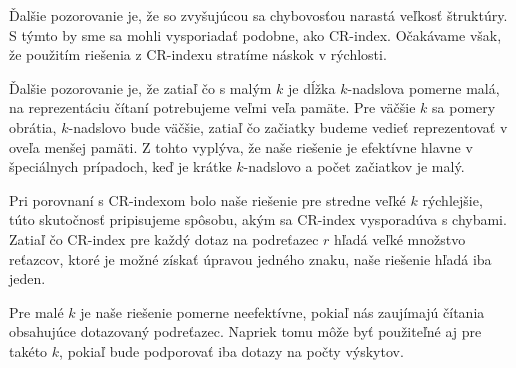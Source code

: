 Ďalšie pozorovanie je, že so zvyšujúcou sa chybovosťou narastá veľkosť štruktúry.
S týmto by sme sa mohli vysporiadať podobne, ako CR-index. Očakávame však, že použitím
riešenia z CR-indexu stratíme náskok v rýchlosti.

Ďalšie pozorovanie je, že zatiaľ čo s malým $k$ je dĺžka $k$-nadslova pomerne malá, na
reprezentáciu čítaní potrebujeme veľmi veľa pamäte. Pre väčšie $k$ sa pomery obrátia,
$k$-nadslovo bude väčšie, zatiaľ čo začiatky budeme vedieť reprezentovať v oveľa menšej pamäti.
Z tohto vyplýva, že naše riešenie je efektívne hlavne v špeciálnych prípadoch, keď
je krátke $k$-nadslovo a počet začiatkov je malý.

Pri porovnaní s CR-indexom bolo naše riešenie pre stredne veľké $k$ rýchlejšie, túto
skutočnosť pripisujeme spôsobu, akým sa CR-index vysporadúva s chybami. Zatiaľ čo
CR-index pre každý dotaz na podreťazec $r$ hľadá veľké množstvo reťazcov, ktoré je možné
získať úpravou jedného znaku, naše riešenie hľadá iba jeden.

Pre malé $k$ je naše riešenie pomerne neefektívne, pokiaľ nás zaujímajú čítania obsahujúce
dotazovaný podreťazec. Napriek tomu môže byť použiteľné aj pre takéto $k$, pokiaľ bude
podporovať iba dotazy na počty výskytov.
